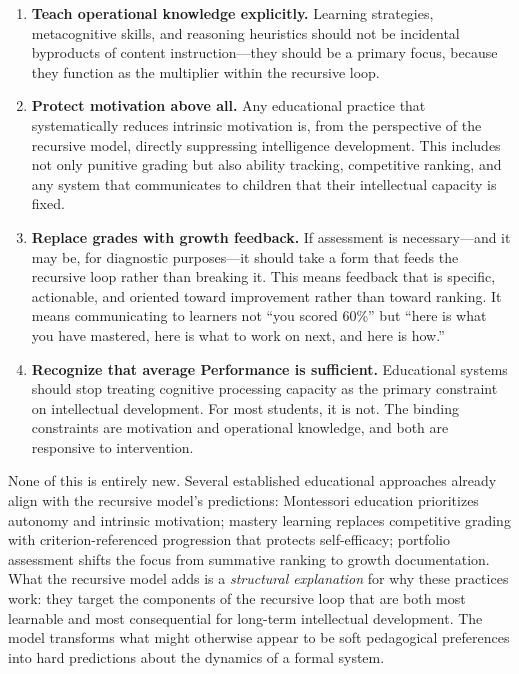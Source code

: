 \documentclass[12pt,a4paper]{article}
\begin{document}
\begin{enumerate}
\item \textbf{Teach operational knowledge explicitly.} Learning strategies, metacognitive skills, and reasoning heuristics should not be incidental byproducts of content instruction---\hspace{0pt}they should be a primary focus, because they function as the multiplier within the recursive loop.

\item \textbf{Protect motivation above all.} Any educational practice that systematically reduces intrinsic motivation is, from the perspective of the recursive model, directly suppressing intelligence development. This includes not only punitive grading but also ability tracking, competitive ranking, and any system that communicates to children that their intellectual capacity is fixed.

\item \textbf{Replace grades with growth feedback.} If assessment is necessary---\hspace{0pt}and it may be, for diagnostic purposes---\hspace{0pt}it should take a form that feeds the recursive loop rather than breaking it. This means feedback that is specific, actionable, and oriented toward improvement rather than toward ranking. It means communicating to learners not ``you scored 60\%'' but ``here is what you have mastered, here is what to work on next, and here is how.''

\item \textbf{Recognize that average Performance is sufficient.} Educational systems should stop treating cognitive processing capacity as the primary constraint on intellectual development. For most students, it is not. The binding constraints are motivation and operational knowledge, and both are responsive to intervention.
\end{enumerate}

None of this is entirely new. Several established educational approaches already align with the recursive model's predictions: Montessori education prioritizes autonomy and intrinsic motivation; mastery learning \citep{Bloom1968} replaces competitive grading with criterion-referenced progression that protects self-efficacy; portfolio assessment shifts the focus from summative ranking to growth documentation. What the recursive model adds is a \emph{structural explanation} for why these practices work: they target the components of the recursive loop that are both most learnable and most consequential for long-term intellectual development. The model transforms what might otherwise appear to be soft pedagogical preferences into hard predictions about the dynamics of a formal system.
\end{document}
